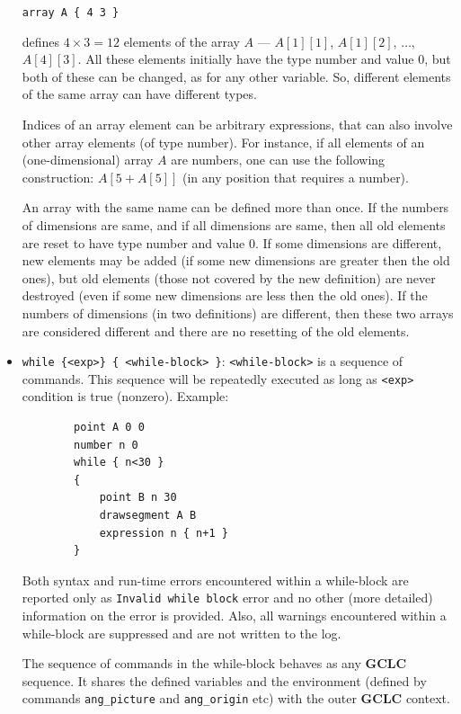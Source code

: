 \documentclass[a4paper]{book}
\newcommand{\gclc}{{\bfseries GCLC}\xspace}
\begin{document}
\begin{itemize}
    \verb|array A { 4 3 }|

    defines $4 \times 3 = 12$ elements of the array $A$ --- $A[1][1]$,
    $A[1][2]$, $\ldots$, $A[4][3]$. All these elements initially have
    the type {\sc number} and value $0$, but both of these can be
    changed, as for any other variable. So, different elements of the
    same array can have different types.

    Indices of an array element can be arbitrary expressions, that can
    also involve other array elements (of type {\sc number}). For
    instance, if all elements of an (one-dimensional) array $A$ are
    numbers, one can use the following construction: $A[ 5+A[5]]$
    (in any position that requires a number).

    An array with the same name can be defined more than once. If the
    numbers of dimensions are same, and if all dimensions are same,
    then all old elements are reset to have type {\sc number} and
    value $0$. If some dimensions are different, new elements
    may be added (if some new dimensions are greater then the old
    ones), but old elements (those not covered by the new definition)
    are never destroyed (even if some new dimensions are less then the old
    ones). If the numbers of dimensions (in two definitions) are
    different, then these two arrays are considered different and
    there are no resetting of the old elements.


\item \verb|while {<exp>} { <while-block> }|:
        \verb|<while-block>| is a sequence of commands. This sequence will be repeatedly
        executed as long as \verb|<exp>| condition is true (nonzero). Example:

        \begin{verbatim}
        point A 0 0
        number n 0
        while { n<30 }
        {
            point B n 30
            drawsegment A B
            expression n { n+1 }
        }
        \end{verbatim}

        Both syntax and run-time errors encountered within a while-block are reported only
        as \verb|Invalid while block| error and no other (more detailed) information on the
        error is provided. Also, all warnings encountered within a while-block are suppressed
        and are not written to the log.

        The sequence of commands in the while-block behaves as any \gclc sequence. It
        shares the defined variables and the environment (defined by commands
        \verb|ang_picture| and \verb|ang_origin| etc) with the outer \gclc context.


\end{itemize}
\end{document}
